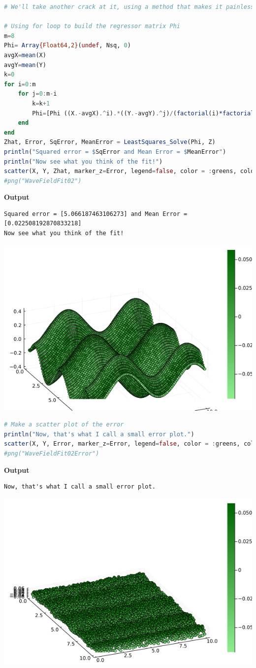 \begin{lstlisting}[language=Julia,style=mystyle]
# We'll take another crack at it, using a method that makes it painless to include more terms

# Using for loop to build the regressor matrix Phi
m=8
Phi= Array{Float64,2}(undef, Nsq, 0)
avgX=mean(X)
avgY=mean(Y)
k=0
for i=0:m
    for j=0:m-i
        k=k+1
        Phi=[Phi ((X.-avgX).^i).*((Y.-avgY).^j)/(factorial(i)*factorial(j))]
    end
end
Zhat, Error, SqError, MeanError = LeastSquares_Solve(Phi, Z)
println("Squared error = $SqError and Mean Error = $MeanError")
println("Now see what you think of the fit!")
scatter(X, Y, Zhat, marker_z=Error, legend=false, color = :greens, colorbar=true, camera=(-60, 60))
#png("WaveFieldFit02")
\end{lstlisting}
\textbf{Output} 
\begin{verbatim}
Squared error = [5.066187463106273] and Mean Error = [0.022508192870833218]
Now see what you think of the fit!
\end{verbatim}


\vspace*{.2cm}


\includegraphics[width=0.7\columnwidth]{graphics/Chap06/WaveFieldFit02.png}


\vspace*{.2cm}

\begin{lstlisting}[language=Julia,style=mystyle]
# Make a scatter plot of the error
println("Now, that's what I call a small error plot.")
scatter(X, Y, Error, marker_z=Error, legend=false, color = :greens, colorbar=true, camera=(-60, 60))
#png("WaveFieldFit02Error")
\end{lstlisting}
\textbf{Output} 
\begin{verbatim}
Now, that's what I call a small error plot.
\end{verbatim}
\includegraphics[width=0.7\columnwidth]{graphics/Chap06/WaveFieldFit02Error.png}

